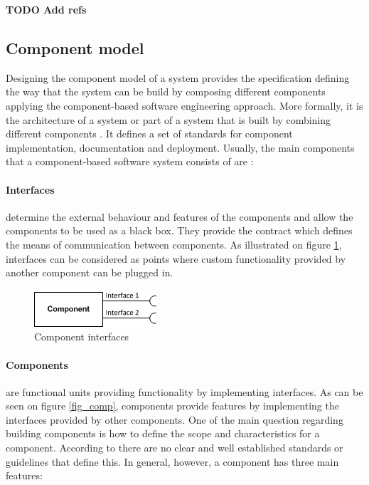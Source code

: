 \textbf{TODO Add refs}

\subsection{Component model}

Designing the component model of a system provides the specification defining the way that the system can be build by composing different components applying the component-based software engineering approach. More formally, it is the architecture of a system or part of a system that is built by combining different components \cite{Cai}. It defines a set of  standards for component implementation, documentation and deployment. Usually, the main components that a component-based software system consists of are \cite{Chen}:

\paragraph{Interfaces}
	determine the external behaviour and features of the components and allow the components to be used as a black box. They provide the contract which defines the means of communication between components. As illustrated on figure \ref{fig_intf}, interfaces can be considered as points where custom functionality provided by another component can be plugged in. 
	
	\begin{figure}[h!]
  		\centering
  		\includegraphics[scale=0.75]{plug-in/component-interfaces.png}
  		\caption{Component interfaces }
  		\label{fig_intf}
	\end{figure}

\paragraph{Components}
	are functional units providing functionality by implementing interfaces. As can be seen on figure \ref{fig_comp}, components provide  features by implementing the interfaces provided by other components. One of the main question regarding building components is how to define the scope and characteristics for a component. According to \cite{Cai} there are no clear and well established standards or guidelines that define this. In general, however, a component has three main features: 

